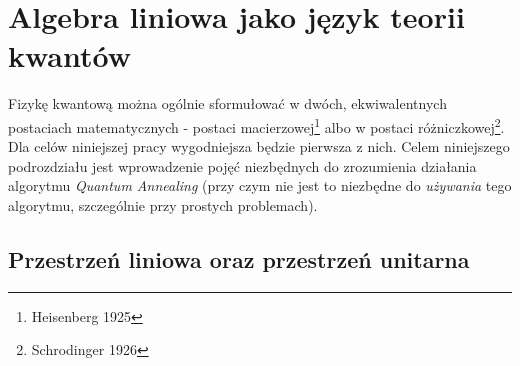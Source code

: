 \documentclass[12pt,a4paper,twoside,openany]{book}
\begin{document}
\section{Algebra liniowa jako język teorii kwantów}

Fizykę kwantową można ogólnie sformułować w dwóch, ekwiwalentnych postaciach matematycznych - postaci macierzowej\footnote{Heisenberg 1925} albo w postaci różniczkowej\footnote{Schrodinger 1926}. Dla celów niniejszej pracy wygodniejsza będzie pierwsza z nich. Celem niniejszego podrozdziału jest wprowadzenie pojęć niezbędnych do zrozumienia działania algorytmu \textit{Quantum Annealing} (przy czym nie jest to niezbędne do \textit{używania} tego algorytmu, szczególnie przy prostych problemach). 

\subsection{Przestrzeń liniowa oraz przestrzeń unitarna}
\end{document}
